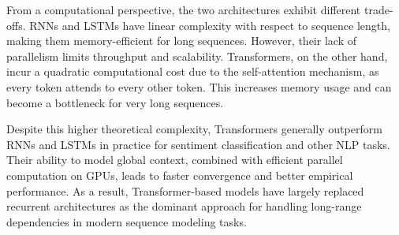 From a computational perspective, the two architectures
exhibit different trade-offs.
RNNs and LSTMs have linear complexity with respect to
sequence length, making them memory-efficient for long
sequences.
However, their lack of parallelism limits throughput and
scalability.
Transformers, on the other hand, incur a quadratic
computational cost due to the self-attention mechanism,
as every token attends to every other token.
This increases memory usage and can become a bottleneck
for very long sequences.

Despite this higher theoretical complexity, Transformers
generally outperform RNNs and LSTMs in practice for sentiment
classification and other NLP tasks.
Their ability to model global context, combined with efficient
parallel computation on GPUs, leads to faster convergence and
better empirical performance.
As a result, Transformer-based models have largely replaced
recurrent architectures as the dominant approach for handling
long-range dependencies in modern sequence modeling tasks.
